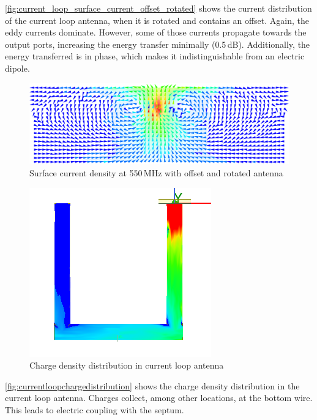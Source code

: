\autoref{fig:current_loop_surface_current_offset_rotated} shows the current distribution of the current loop antenna, when it is rotated and contains an offset. Again, the eddy currents dominate. However, some of those currents propagate towards the output ports, increasing the energy transfer minimally (0.5\,dB). Additionally, the energy transferred is in phase, which makes it indistinguishable from an electric dipole.

\begin{figure}[h]
    \centering
    \includegraphics[width=1\linewidth]{content//30_simulations//img/current_loop_surface_current_offset_rotated.png}
    \caption{Surface current density at 550\,MHz with offset and rotated antenna}
    \label{fig:current_loop_surface_current_offset_rotated}
\end{figure}



\begin{figure}[h]
	\centering
	\includegraphics[width=0.5\linewidth]{content/30_simulations/img/current_loop_charge_distribution}
	\caption{Charge density distribution in current loop antenna}
	\label{fig:currentloopchargedistribution}
\end{figure}

\autoref{fig:currentloopchargedistribution} shows the charge density distribution in the current loop antenna. Charges collect, among other locations, at the bottom wire. This leads to electric coupling with the septum. 

